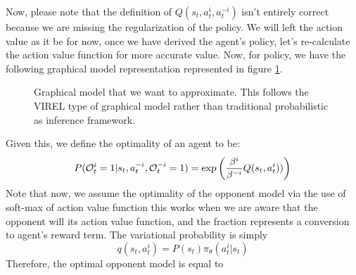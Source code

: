 Now, please note that the definition of $Q(s_t, a^i_t, a^{-i}_t)$ isn't entirely correct because we are missing the regularization of the policy. We will left the action value as it be for now, once we have derived the agent's policy, let's re-calculate the action value function for more accurate value. Now, for policy, we have the following graphical model representation represented in figure \ref{fig:chap3-balancing-Q-agent}.
\begin{figure}[ht]
    \begin{minipage}[t]{0.5\linewidth}
    \centering
    \end{minipage}%
    \begin{minipage}[t]{0.5\linewidth}
    \caption{Graphical model that we want to approximate. This follows the VIREL \cite{fellows2019virel} type of graphical model rather than traditional probabilistic as inference framework.}
    \label{fig:chap3-balancing-Q-agent}
    \end{minipage}
\end{figure}
Given this, we define the optimality of an agent to be:
\begin{equation}
    P(\mathcal{O}^{i}_t = 1 | s_t, a^{-i}_t, \mathcal{O}^{-i}_t = 1) = \exp \left(  \frac{\beta^{i}}{\beta^{-i}} Q(s_t, a^{i}_t))   \right)
\end{equation}
Note that now, we assume the optimality of the opponent model via the use of soft-max of action value function this works when we are aware that the opponent will  its action value function, and the fraction represents a conversion to agent's reward term. The variational probability is simply 
\begin{equation}
    q(s_t, a^{i}_t) = P(s_t) \pi_\theta(a^{i}_t | s_t)
\end{equation}
Therefore, the optimal opponent model is equal to 
